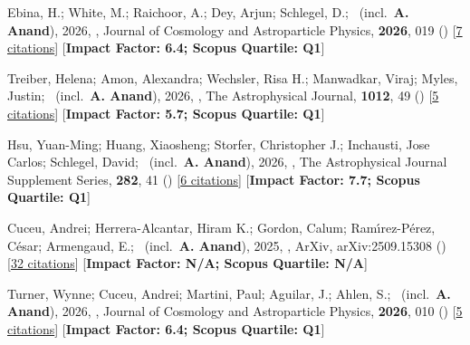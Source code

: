 \item[{\color{numcolor}\scriptsize24}] Ebina, H.; White, M.; Raichoor, A.; Dey, Arjun; Schlegel, D.; \etal\ (incl.\ \textbf{A. Anand}), 2026, , Journal of Cosmology and Astroparticle Physics, \textbf{2026}, 019 () [\href{https://ui.adsabs.harvard.edu/abs/2026JCAP...03..019E}{7 citations}] [\textbf{Impact Factor: 6.4; Scopus Quartile: Q1}]

\item[{\color{numcolor}\scriptsize23}] Treiber, Helena; Amon, Alexandra; Wechsler, Risa H.; Manwadkar, Viraj; Myles, Justin; \etal\ (incl.\ \textbf{A. Anand}), 2026, , The Astrophysical Journal, \textbf{1012}, 49 () [\href{https://ui.adsabs.harvard.edu/abs/2026ApJ..1012...49T}{5 citations}] [\textbf{Impact Factor: 5.7; Scopus Quartile: Q1}]

\item[{\color{numcolor}\scriptsize22}] Hsu, Yuan-Ming; Huang, Xiaosheng; Storfer, Christopher J.; Inchausti, Jose Carlos; Schlegel, David; \etal\ (incl.\ \textbf{A. Anand}), 2026, , The Astrophysical Journal Supplement Series, \textbf{282}, 41 () [\href{https://ui.adsabs.harvard.edu/abs/2026ApJS..282...41H}{6 citations}] [\textbf{Impact Factor: 7.7; Scopus Quartile: Q1}]

\item[{\color{numcolor}\scriptsize21}] Cuceu, Andrei; Herrera-Alcantar, Hiram K.; Gordon, Calum; Ram{\'\i}rez-P{\'e}rez, C{\'e}sar; Armengaud, E.; \etal\ (incl.\ \textbf{A. Anand}), 2025, , ArXiv, arXiv:2509.15308 () [\href{https://ui.adsabs.harvard.edu/abs/2025arXiv250915308C}{32 citations}] [\textbf{Impact Factor: N/A; Scopus Quartile: N/A}]

\item[{\color{numcolor}\scriptsize20}] Turner, Wynne; Cuceu, Andrei; Martini, Paul; Aguilar, J.; Ahlen, S.; \etal\ (incl.\ \textbf{A. Anand}), 2026, , Journal of Cosmology and Astroparticle Physics, \textbf{2026}, 010 () [\href{https://ui.adsabs.harvard.edu/abs/2026JCAP...05..010T}{5 citations}] [\textbf{Impact Factor: 6.4; Scopus Quartile: Q1}]

